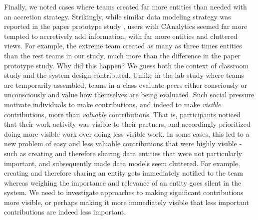 Finally, we noted cases where teams created far more entities than needed with an
accretion strategy. Strikingly, while similar data modeling strategy was
reported in the paper prototype study \cite{Carroll2013}, users with CAnalytics
seemed far more tempted to accretively add information, with far more entities
and cluttered views. For example, the extreme team created as many as three
times entities than the rest teams in our study, much more than the difference
in the paper prototype study. Why did this happen? We guess both the context of
classroom study and the system design contributed. Unlike in the lab study where
teams are temporarily assembled, teams in a class evaluate peers either
consciously or unconsciously and value how themselves are being evaluated. Such
social pressure motivate individuals to make contributions, and indeed to make
\emph{visible} contributions, more than \emph{valuable} contributions. That is,
participants noticed that their work activity was visible to their partners, and
accordingly prioritized doing more visible work over doing less visible work. In
some cases, this led to a new problem of easy and less valuable contributions
that were highly visible - such as creating and therefore sharing data entities
that were not particularly important, and subsequently made data models seem
cluttered. For example, creating and therefore sharing an entity gets
immediately notified to the team whereas weighing the importance and relevance
of an entity goes silent in the system. We need to investigate approaches to
making significant contributions more visible, or perhaps making it more
immediately visible that less important contributions are indeed less important.
